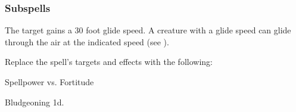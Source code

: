 \subsubsection{Subspells}



The target gains a 30 foot glide speed.
A creature with a glide speed can glide through the air at the indicated speed (see ).









Replace the spell's targets and effects with the following:
\begin{spellcontent}

\begin{augmenttargetinginfo}



\end{augmenttargetinginfo}


\begin{augmenteffects}




\begin{spellattack}{Spellpower vs. Fortitude}


\spellsuccess Bludgeoning  \plus1d.


\end{spellattack}





\end{augmenteffects}

\end{spellcontent}








